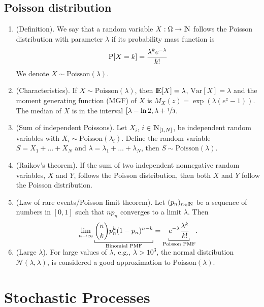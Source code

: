 \documentclass[a4paper,10pt]{article}
\begin{document}
\subsection{Poisson distribution}
\begin{enumerate}
 \item (Definition). We say that a random variable \(X:\Omega\to\N\) follows the Poisson distribution
       with parameter \(\lambda\) if its probability mass function is
       \[
        \mathrm{P}[X = k] = \frac{\lambda^k e^{-\lambda}}{k!}
       \]
       We denote \(X\sim\mathrm{Poisson}(\lambda)\).
 \item (Characteristics). If \(X\sim\mathrm{Poisson}(\lambda)\), then \(\E[X]=\lambda\), 
       \(\mathrm{Var}[X]=\lambda\) and the moment generating function (MGF) of \(X\) is 
        \(M_X(z) = \exp(\lambda (e^z - 1))\). The median of \(X\) is in the interval 
        \([\lambda - \ln 2, \lambda + \nicefrac{1}{3}\).
        
 \item (Sum of independent Poissons). Let \(X_i\), \(i\in\N_{[1,N]}\), be independent random 
       variables with \(X_i\sim\mathrm{Poisson}(\lambda_i)\). Define the random variable 
       \(S = X_1 + \ldots + X_N\) and \(\lambda = \lambda_1 + \ldots + \lambda_N\), then
       \(S \sim \mathrm{Poisson}(\lambda)\).
       
 \item (Raikov's theorem). If the sum of two independent nonnegative random variables, 
       \(X\) and \(Y\), follows the Poisson distribution, then both \(X\) and \(Y\)
       follow the Poisson distribution.
       
 \item (Law of rare events/Poisson limit theorem). Let \((p_n)_{n\in\N}\) be a sequence of 
       numbers in \([0,1]\) such that \(np_n\) converges to a limit \(\lambda\). Then
       \[
        \lim_{n\to\infty}\smashunderbracket{{n \choose k} p_n^k (1-p_n)^{n-k}}{\text{Binomial PMF}} 
        =
        \smashunderbracket{e^{-\lambda}\frac{\lambda^k}{k!}}{\text{Poisson PMF}}.
       \]
 \item (Large \(\lambda\)). For large values of \(\lambda\), e.g., \(\lambda>10^3\), the 
       normal distribution \(\mathcal{N}(\lambda, \lambda)\), is considered 
       a good approximation to \(\mathrm{Poisson}(\lambda)\).

\end{enumerate}



\section{Stochastic Processes}
\end{document}
